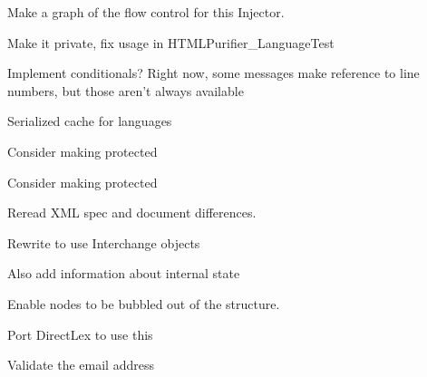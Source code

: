 \begin{DoxyRefList}
Make a graph of the flow control for this Injector.  
\item[\label{todo__todo000050}%
\hypertarget{todo__todo000050}{}%
Global \hyperlink{class_h_t_m_l_purifier___language_a62e5e65f9b0732d62a684572f5dcfbe6}{H\-T\-M\-L\-Purifier\-\_\-\-Language\-:\-:\$\-\_\-loaded} ]Make it private, fix usage in H\-T\-M\-L\-Purifier\-\_\-\-Language\-Test  
\item[\label{todo__todo000051}%
\hypertarget{todo__todo000051}{}%
Global \hyperlink{class_h_t_m_l_purifier___language_ad4d7cc1a149ffb7c518a623ab1192f64}{H\-T\-M\-L\-Purifier\-\_\-\-Language\-:\-:format\-Message} (\$key, \$args=array())]Implement conditionals? Right now, some messages make reference to line numbers, but those aren't always available  
\item[\label{todo__todo000052}%
\hypertarget{todo__todo000052}{}%
Class \hyperlink{class_h_t_m_l_purifier___language_factory}{H\-T\-M\-L\-Purifier\-\_\-\-Language\-Factory} ]Serialized cache for languages  
\item[\label{todo__todo000055}%
\hypertarget{todo__todo000055}{}%
Global \hyperlink{class_h_t_m_l_purifier___lexer_af676fe0bcc741ac0cd916d84ca359715}{H\-T\-M\-L\-Purifier\-\_\-\-Lexer\-:\-:extract\-Body} (\$html)]Consider making protected  
\item[\label{todo__todo000054}%
\hypertarget{todo__todo000054}{}%
Global \hyperlink{class_h_t_m_l_purifier___lexer_ade50cc02798122d7dca0122b1c9b3992}{H\-T\-M\-L\-Purifier\-\_\-\-Lexer\-:\-:normalize} (\$html, \$config, \$context)]Consider making protected  
\item[\label{todo__todo000053}%
\hypertarget{todo__todo000053}{}%
Class \hyperlink{class_h_t_m_l_purifier___lexer___direct_lex}{H\-T\-M\-L\-Purifier\-\_\-\-Lexer\-\_\-\-Direct\-Lex} ]Reread X\-M\-L spec and document differences.  
\item[\label{todo__todo000056}%
\hypertarget{todo__todo000056}{}%
Class \hyperlink{class_h_t_m_l_purifier___printer___config_form}{H\-T\-M\-L\-Purifier\-\_\-\-Printer\-\_\-\-Config\-Form} ]Rewrite to use Interchange objects  
\item[\label{todo__todo000057}%
\hypertarget{todo__todo000057}{}%
Global \hyperlink{class_h_t_m_l_purifier___printer___h_t_m_l_definition_a45ce13377b80313b45260afcbeee5a83}{H\-T\-M\-L\-Purifier\-\_\-\-Printer\-\_\-\-H\-T\-M\-L\-Definition\-:\-:listify\-Object\-List} (\$array)]Also add information about internal state  
\item[\label{todo__todo000058}%
\hypertarget{todo__todo000058}{}%
Class \hyperlink{class_h_t_m_l_purifier___strategy___fix_nesting}{H\-T\-M\-L\-Purifier\-\_\-\-Strategy\-\_\-\-Fix\-Nesting} ]Enable nodes to be bubbled out of the structure.  
\item[\label{todo__todo000059}%
\hypertarget{todo__todo000059}{}%
Class \hyperlink{class_h_t_m_l_purifier___token_factory}{H\-T\-M\-L\-Purifier\-\_\-\-Token\-Factory} ]Port Direct\-Lex to use this  
\item[\label{todo__todo000060}%
\hypertarget{todo__todo000060}{}%
Class \hyperlink{class_h_t_m_l_purifier___u_r_i_scheme__mailto}{H\-T\-M\-L\-Purifier\-\_\-\-U\-R\-I\-Scheme\-\_\-mailto} ]Validate the email address 


\end{DoxyRefList}
